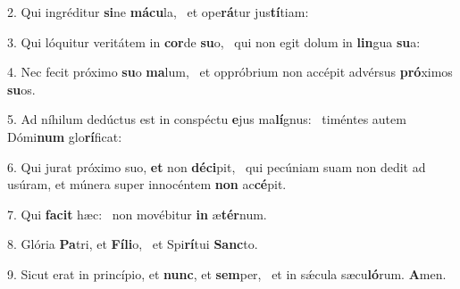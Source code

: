 2. Qui ingréditur \textbf{si}ne \textbf{má}\textbf{cu}la, \ast\  et ope\textbf{rá}tur jus\textbf{tí}tiam:\

3. Qui lóquitur veritátem in \textbf{cor}de \textbf{su}o, \ast\  qui non egit dolum in \textbf{lin}gua \textbf{su}a:\

4. Nec fecit próximo \textbf{su}o \textbf{ma}lum, \ast\  et oppróbrium non accépit advérsus \textbf{pró}ximos \textbf{su}os.\

5. Ad níhilum dedúctus est in conspéctu \textbf{e}jus ma\textbf{lí}gnus: \ast\  timéntes autem Dómi\textbf{num} glo\textbf{rí}ficat:\

6. Qui jurat próximo suo, \textbf{et} non \textbf{dé}\textbf{ci}pit, \ast\  qui pecúniam suam non dedit ad usúram, et múnera super innocéntem \textbf{non} ac\textbf{cé}pit.\

7. Qui \textbf{fa}\textbf{cit} hæc: \ast\  non movébitur \textbf{in} æ\textbf{tér}num.\

8. Glória \textbf{Pa}tri, et \textbf{Fí}\textbf{li}o, \ast\  et Spi\textbf{rí}tui \textbf{Sanc}to.\

9. Sicut erat in princípio, et \textbf{nunc}, et \textbf{sem}per, \ast\  et in sǽcula sæcu\textbf{ló}rum. \textbf{A}men.\

